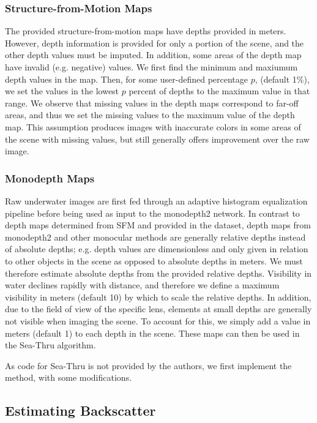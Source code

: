 \documentclass[10pt,twocolumn,letterpaper]{article}
\begin{document}
\subsubsection*{Structure-from-Motion Maps}
The provided structure-from-motion maps have depths provided in meters.
However, depth information is provided for only a portion of the scene, and the other depth
values must be imputed.
In addition, some areas of the depth map have invalid (e.g. negative)
values.
We first find the minimum and maxiumum depth values in the map. Then, for some user-defined
percentage $p$, (default 1\%), we set the values in the lowest $p$ percent of depths to the maximum
value in that range.
We observe that missing values in the depth maps correspond to far-off areas, and thus we set the
missing values to the maximum value of the depth map.
This assumption produces images with inaccurate colors in some areas of the scene with missing values,
but still generally offers improvement over the raw image.

\subsubsection*{Monodepth Maps}
Raw underwater images are first fed through an adaptive histogram equalization pipeline before being used
as input to the monodepth2 network.
In contrast to depth maps determined from SFM and provided in the dataset, depth maps from monodepth2 and other monocular
methods are generally relative depths instead of absolute depths;
e.g. depth values are dimensionless and only given in relation to other objects in the scene as
opposed to absolute depths in meters.
We must therefore estimate absolute depths from the provided relative depths. Visibility in water declines
rapidly with distance, and therefore we define a maximum visibility in meters (default 10) by which to scale the
relative depths. In addition, due to the field of view of the specific lens, elements at small depths
are generally not visible when imaging the scene. To account for this, we simply add a value in meters (default 1)
to each depth in the scene. These maps can then be used in the Sea-Thru algorithm.

As code for Sea-Thru is not provided by the authors, we first implement the method, with
some modifications.

\subsection{Estimating Backscatter}
\label{sec:estbackscatter}
\end{document}
